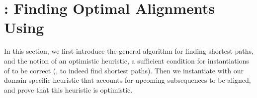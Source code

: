\section{\astarix: Finding Optimal Alignments Using \A} \label{TRIEsec:astarix-algo}
In this section, we first introduce the general \A algorithm for finding
shortest paths, and the notion of an optimistic heuristic, a sufficient
condition for instantiations of \A to be correct (\ie, to indeed find shortest
paths). Then we instantiate \A with our domain-specific heuristic that accounts
for upcoming subsequences to be aligned, and prove that this heuristic is
optimistic.


